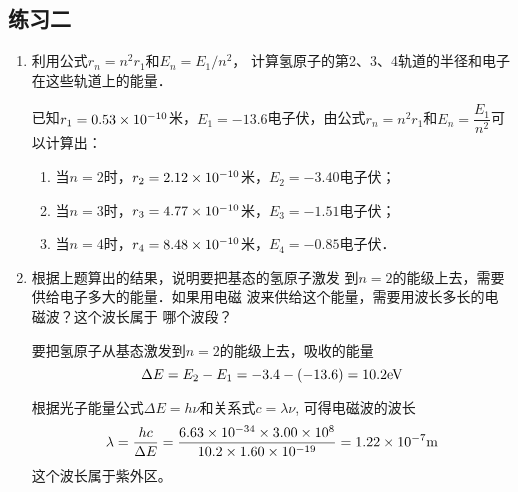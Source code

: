 \subsection{练习二}

\begin{enumerate}
    \item 利用公式$r_n=n^2r_1$和$E_n=E_1/n^2$，
计算氢原子的第2、3、4轨道的半径和电子在这些轨道上的能量．

\begin{solution}
已知$r_1=0.53\times10^{-10}$米，$E_1=-13.6$电子伏，由公式$r_n=n^2r_1$和$E_n=\dfrac{E_1}{n^2}$可以计算出：
\begin{enumerate}
    \item 当$n=2$时，$r_2=2.12\times10^{-10}$米，$E_2=-3.40$电子伏；
    \item 当$n=3$时，$r_3=4.77\times10^{-10}$米，$E_3=-1.51$电子伏；
    \item 当$n=4$时，$r_4=8.48\times10^{-10}$米，$E_4=-0.85$电子伏．
\end{enumerate}

\end{solution}
\item 根据上题算出的结果，说明要把基态的氢原子激发
到$n=2$的能级上去，需要供给电子多大的能量．如果用电磁
波来供给这个能量，需要用波长多长的电磁波？这个波长属于
哪个波段？

\begin{solution}
    要把氢原子从基态激发到$n=2$的能级上去，吸收的能量
    $$\Delta E=E_2-E_1=-3.4-(-13. 6)=10. 2{\rm eV}$$

    根据光子能量公式$\Delta E=h\nu$和关系式$c=\lambda \nu$, 可得电磁波的波长
\[\lambda=\frac{hc}{\Delta E}=\frac{6.63\times 10^{-34}\times 3.00\times 10^8}{10.2\times 1.60\times 10^{-19}}=1.22\times 10^{-7}{\rm m}\]
这个波长属于紫外区。
\end{solution}
\end{enumerate}



